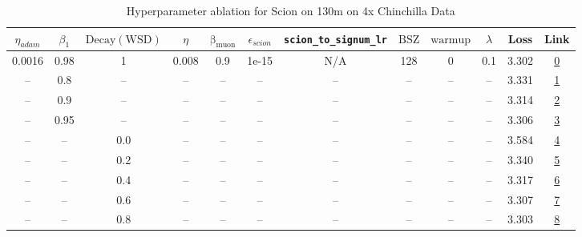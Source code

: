 \begin{table}[H]
\centering
\caption{Hyperparameter ablation for Scion on 130m on 4x Chinchilla Data}
\label{tab:ablation_scion_130m_4}
\begin{tabular}{cccccccccccc}
\toprule
$\eta_{adam}$ & $\beta_1$ & $\mathrm{Decay (WSD)}$ & $\eta$ & $\mathrm{\beta_{muon}}$ & $\epsilon_{scion}$ & \texttt{scion\_to\_signum\_lr} & $\mathrm{BSZ}$ & $\mathrm{warmup}$ & $\lambda$ & Loss & Link \\
\midrule
0.0016 & 0.98 & 1 & 0.008 & 0.9 & 1e-15 & N/A & 128 & 0 & 0.1 & 3.302 & \href{https://wandb.ai/stanford-mercury/optimizer-scaling/runs/sweep-130m-10B-scion9698d1lr0.008-wd0.1-minlr0-warmup0-b10.98-gn-7282fc}{0} \\
\midrule
-- & 0.8 & -- & -- & -- & -- & -- & -- & -- & -- & 3.331 & \href{https://wandb.ai/stanford-mercury/optimizer-scaling/runs/sweep-130m-10B-scion40e7b5lr0.008-wd0.1-minlr0-warmup0-b10.8-gn2-eda693}{1} \\
-- & 0.9 & -- & -- & -- & -- & -- & -- & -- & -- & 3.314 & \href{https://wandb.ai/stanford-mercury/optimizer-scaling/runs/sweep-130m-10B-scion51153elr0.008-wd0.1-minlr0-warmup0-b10.9-gn2-da2cf1}{2} \\
-- & 0.95 & -- & -- & -- & -- & -- & -- & -- & -- & 3.306 & \href{https://wandb.ai/stanford-mercury/optimizer-scaling/runs/sweep-130m-10B-sciond34ea1lr0.008-wd0.1-minlr0-warmup0-b10.95-gn-2dd73c}{3} \\
-- & -- & 0.0 & -- & -- & -- & -- & -- & -- & -- & 3.584 & \href{https://wandb.ai/stanford-mercury/optimizer-scaling/runs/sweep-130m-10B-scion1be043lr0.008-wd0.1-minlr0-warmup0-b10.98-gn-629a0b}{4} \\
-- & -- & 0.2 & -- & -- & -- & -- & -- & -- & -- & 3.340 & \href{https://wandb.ai/stanford-mercury/optimizer-scaling/runs/sweep-130m-10B-scionff2a74lr0.008-wd0.1-minlr0-warmup0-b10.98-gn-70dbae}{5} \\
-- & -- & 0.4 & -- & -- & -- & -- & -- & -- & -- & 3.317 & \href{https://wandb.ai/stanford-mercury/optimizer-scaling/runs/sweep-130m-10B-scion93c728lr0.008-wd0.1-minlr0-warmup0-b10.98-gn-0b64cb}{6} \\
-- & -- & 0.6 & -- & -- & -- & -- & -- & -- & -- & 3.307 & \href{https://wandb.ai/stanford-mercury/optimizer-scaling/runs/sweep-130m-10B-scion232c0flr0.008-wd0.1-minlr0-warmup0-b10.98-gn-beec93}{7} \\
-- & -- & 0.8 & -- & -- & -- & -- & -- & -- & -- & 3.303 & \href{https://wandb.ai/stanford-mercury/optimizer-scaling/runs/sweep-130m-10B-scion2554c3lr0.008-wd0.1-minlr0-warmup0-b10.98-gn-0ecfe4}{8} \\

\end{tabular}
\end{table}
